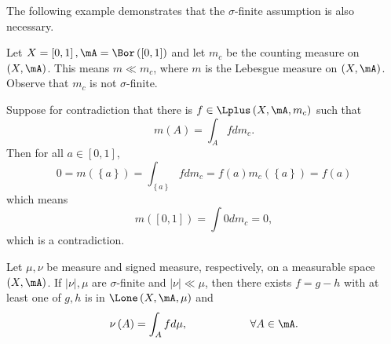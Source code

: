 \documentclass[pmath451]{subfiles}
\begin{document}
    The following example demonstrates that the $\sigma$-finite assumption is also necessary.
    
    \begin{example}{}
        Let $X=\left[ 0,1 \right], \mA=\Bor\left( \left[ 0,1 \right] \right)$ and let $m_c$ be the counting measure on $\left( X,\mA \right)$. This means $m\ll m_c$, where $m$ is the Lebesgue measure on $\left( X,\mA \right)$. Observe that $m_c$ is not $\sigma$-finite.

        Suppose for contradiction that there is $f\in\Lplus\left( X,\mA,m_c \right)$ such that
        \begin{equation*}
            m\left( A \right) = \int_Afdm_c.
        \end{equation*}
        Then for all $a\in\left[ 0,1 \right]$,
        \begin{equation*}
            0 = m\left( \left\lbrace a \right\rbrace \right) = \int_{\left\lbrace a \right\rbrace}fdm_c = f\left( a \right)m_c\left( \left\lbrace a \right\rbrace \right) = f\left( a \right)
        \end{equation*}
        which means
        \begin{equation*}
            m\left( \left[ 0,1 \right] \right) = \int 0dm_c = 0,
        \end{equation*}
        which is a contradiction.
    \end{example}

    \rruleline
    
    \begin{cor}{}
        Let $\mu,\nu$ be measure and signed measure, respectively, on a measurable space $\left( X,\mA \right)$. If $\left| \nu \right|,\mu$ are $\sigma$-finite and $\left| \nu \right|\ll\mu$, then there exists $f=g-h$ with at least one of $g,h$ is in $\Lone\left( X,\mA,\mu \right)$ and
        \begin{equation*}
            \nu\left( A \right) = \int_Afd\mu, \hspace{2cm}\forall A\in\mA.
        \end{equation*}
    \end{cor}	
\end{document}
